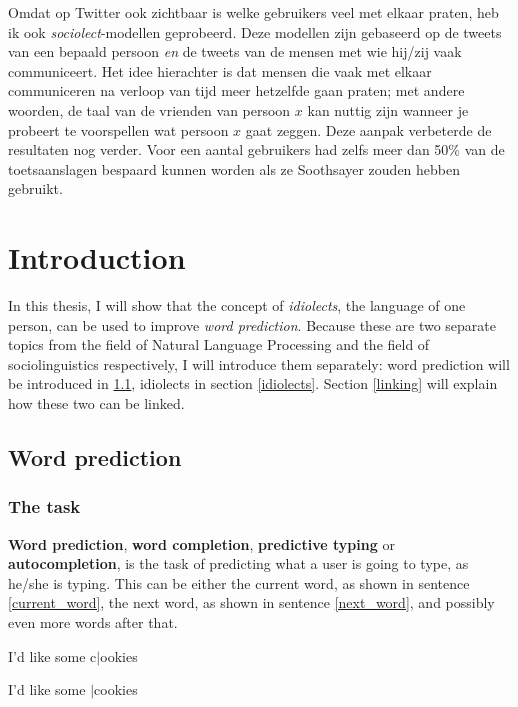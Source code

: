 \documentclass[12pt]{article}
\let\stdsection\section
\renewcommand\section{\newpage\stdsection}
\begin{document}
Omdat op Twitter ook zichtbaar is welke gebruikers veel met elkaar praten, heb ik ook \emph{sociolect}-modellen geprobeerd. Deze modellen zijn gebaseerd op de tweets van een bepaald persoon \emph{en} de tweets van de mensen met wie hij/zij vaak communiceert. Het idee hierachter is dat mensen die vaak met elkaar communiceren na verloop van tijd meer hetzelfde gaan praten; met andere woorden, de taal van de vrienden van persoon $x$ kan nuttig zijn wanneer je probeert te voorspellen wat persoon $x$ gaat zeggen. Deze aanpak verbeterde de resultaten nog verder. Voor een aantal gebruikers had zelfs meer dan 50\% van de toetsaanslagen bespaard kunnen worden als ze Soothsayer zouden hebben gebruikt.

\section{Introduction} \label{intro}

In this thesis, I will show that the concept of \emph{idiolects}, the language of one person, can be used to improve \emph{word prediction}. Because these are two separate topics from the field of Natural Language Processing and the field of sociolinguistics respectively, I will introduce them separately: word prediction will be introduced in \ref{word_prediction}, idiolects in section \ref{idiolects}. Section \ref{linking} will explain how these two can be linked.

\subsection{Word prediction} \label{word_prediction}

\subsubsection{The task}

\textbf{Word prediction}, \textbf{word completion}, \textbf{predictive typing} or \textbf{autocompletion}, is the task of predicting what a user is going to type, as he/she is typing. This can be either the current word, as shown in sentence \ref{current_word}, the next word, as shown in sentence \ref{next_word}, and possibly even more words after that. 
\begin{examples}
\item I'd like some c$|$ookies \label{current_word}
\item I'd like some $|$cookies \label{next_word}
\end{examples}
\end{document}
